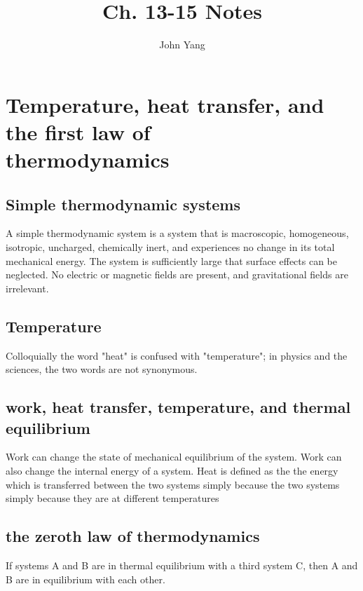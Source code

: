 \documentclass[twocolumn]{article}
\title{Ch. 13-15 Notes}
\author{John Yang}
\begin{document}
\maketitle
\section{Temperature, heat transfer, and the first law of \\thermodynamics}
\subsection{Simple thermodynamic systems}
\begin{outline}
\1 A simple thermodynamic system is a system that is macroscopic, homogeneous, isotropic, uncharged, chemically inert, and experiences no change in its total mechanical energy. The system is sufficiently large that surface effects can be neglected. No electric or magnetic fields are present, and gravitational fields are irrelevant.
\end{outline}
\subsection{Temperature}
\begin{outline}
\1 Colloquially the word "heat" is confused with "temperature"; in physics and the sciences, the two words are not synonymous.
\end{outline}
\subsection{work, heat transfer, temperature, and thermal equilibrium}
\begin{outline}
\1 Work can change the state of mechanical equilibrium of the system. Work can also change the internal energy of a system. 
\1 Heat is defined as the the energy which is transferred between the two systems simply because the two systems simply because they are at different temperatures
\end{outline}
\subsection{the zeroth law of thermodynamics}
\begin{outline}
\1 If systems A and B are in thermal equilibrium with a third system C, then A and B are in equilibrium with each other.
\end{outline}
\end{document}
